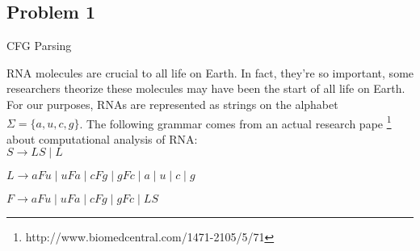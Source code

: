 \documentclass{article}
\begin{document}
\subsection*{Problem 1}
CFG Parsing

RNA molecules are crucial to all life on Earth.  In fact, they're so important, some
researchers theorize these molecules may have been the start of all life on Earth. For our
purposes, RNAs are represented as strings on the alphabet $\Sigma=\{a,u,c,g\}$.  The following 
grammar comes from an actual research pape
\footnote{http://www.biomedcentral.com/1471-2105/5/71} about computational analysis of RNA: \\

    $S \rightarrow LS \;|\; L$

    $L \rightarrow aFu \;|\; uFa \;|\; cFg \;|\; gFc \;|\; a \;|\; u \;|\; c \;|\; g$

    $F \rightarrow aFu \;|\; uFa \;|\; cFg \;|\; gFc \;|\; LS$
\end{document}
